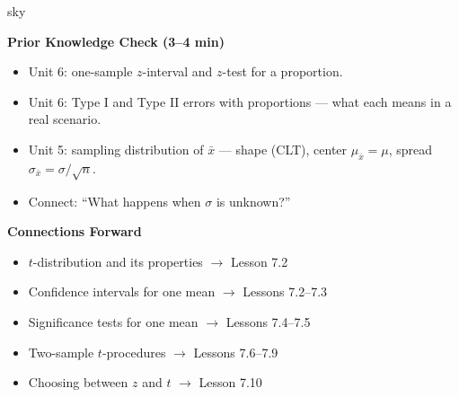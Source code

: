 \documentclass[10pt]{article}
\begin{document}
\begin{skillbox}{sky}
\begin{minipage}[t]{0.48\linewidth}
    \textbf{Prior Knowledge Check (3--4 min)}
    \begin{itemize}
        \item Unit 6: one-sample $z$-interval and $z$-test for a proportion.
        \item Unit 6: Type I and Type II errors with proportions --- what each means
              in a real scenario.
        \item Unit 5: sampling distribution of $\bar x$ --- shape (CLT), center
              $\mu_{\bar x} = \mu$, spread $\sigma_{\bar x} = \sigma/\sqrt{n}$.
        \item Connect: ``What happens when $\sigma$ is unknown?''
    \end{itemize}
\end{minipage}
\hfill
\begin{minipage}[t]{0.48\linewidth}
    \textbf{Connections Forward}
    \begin{itemize}
        \item $t$-distribution and its properties $\to$ Lesson 7.2
        \item Confidence intervals for one mean $\to$ Lessons 7.2--7.3
        \item Significance tests for one mean $\to$ Lessons 7.4--7.5
        \item Two-sample $t$-procedures $\to$ Lessons 7.6--7.9
        \item Choosing between $z$ and $t$ $\to$ Lesson 7.10
    \end{itemize}
\end{minipage}
\end{skillbox}
\end{document}
